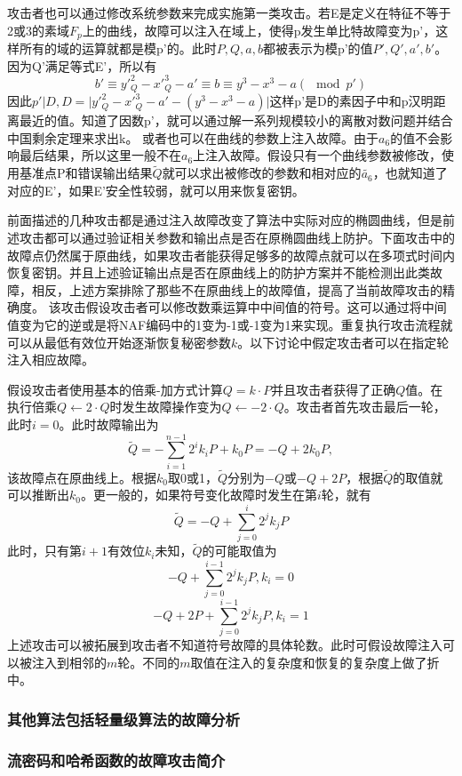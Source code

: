 \documentclass[a4paper,12pt]{article}
\begin{document}
\begin{CJK}{UTF8}{gkai}
攻击者也可以通过修改系统参数来完成实施第一类攻击。若E是定义在特征不等于2或3的素域$F_{p}$上的曲线，故障可以注入在域上，使得p发生单比特故障变为p'，这样所有的域的运算就都是模p'的。此时$P,Q,a,b$都被表示为模p'的值$P',Q',a',b'$。因为Q'满足等式E'，所以有
$$b'\equiv y'^{2}_{Q}-x'^{3}_{Q}-a'\equiv b\equiv y^{3}-x^{3}-a (\mod p')$$
因此$p'|D, D=|y'^{2}_{Q}-x'^{3}_{Q}-a' - (y^{3}-x^{3}-a)|$这样p'是D的素因子中和p汉明距离最近的值。知道了因数p'，就可以通过解一系列规模较小的离散对数问题并结合中国剩余定理来求出k。
或者也可以在曲线的参数上注入故障。由于$a_{6}$的值不会影响最后结果，所以这里一般不在$a_{6}$上注入故障。假设只有一个曲线参数被修改，使用基准点P和错误输出结果$\tilde{Q}$就可以求出被修改的参数和相对应的$\tilde{a_{6}}$，也就知道了对应的E'，如果E'安全性较弱，就可以用来恢复密钥。

前面描述的几种攻击都是通过注入故障改变了算法中实际对应的椭圆曲线，但是前述攻击都可以通过验证相关参数和输出点是否在原椭圆曲线上防护。下面攻击中的故障点仍然属于原曲线，如果攻击者能获得足够多的故障点就可以在多项式时间内恢复密钥。并且上述验证输出点是否在原曲线上的防护方案并不能检测出此类故障，相反，上述方案排除了那些不在原曲线上的故障值，提高了当前故障攻击的精确度。
该攻击假设攻击者可以修改数乘运算中中间值的符号。这可以通过将中间值变为它的逆或是将NAF编码中的1变为-1或-1变为1来实现。重复执行攻击流程就可以从最低有效位开始逐渐恢复秘密参数$k$。以下讨论中假定攻击者可以在指定轮注入相应故障。

假设攻击者使用基本的倍乘-加方式计算$Q=k\cdot P$并且攻击者获得了正确$Q$值。在执行倍乘$Q\leftarrow 2\cdot Q$时发生故障操作变为$Q\leftarrow -2\cdot Q$。攻击者首先攻击最后一轮，此时$i=0$。此时故障输出为
$$\tilde{Q} = -\sum_{i = 1}^{n-1}{2^{i}k_{i}P} + k_{0}P = -Q + 2k_{0}P,$$
该故障点在原曲线上。根据$k_{0}$取0或1，$\tilde{Q}$分别为$-Q$或$-Q+2P$，根据$\tilde{Q}$的取值就可以推断出$k_{0}$。更一般的，如果符号变化故障时发生在第$i$轮，就有
$$\tilde{Q} = -Q + \sum_{j = 0}^{i}{2^{j}k_{j}P}$$
此时，只有第$i+1$有效位$k_{i}$未知，$\tilde{Q}$的可能取值为
$$-Q + \sum_{j = 0}^{i-1}{2^{j}k_{j}P}, k_{i}=0$$
$$-Q + 2P + \sum_{j = 0}^{i-1}{2^{j}k_{j}P}, k_{i}=1$$
上述攻击可以被拓展到攻击者不知道符号故障的具体轮数。此时可假设故障注入可以被注入到相邻的$m$轮。不同的$m$取值在注入的复杂度和恢复的复杂度上做了折中。

\subsubsection{其他算法包括轻量级算法的故障分析}
\subsubsection{流密码和哈希函数的故障攻击简介}


\end{CJK}
\end{document}
